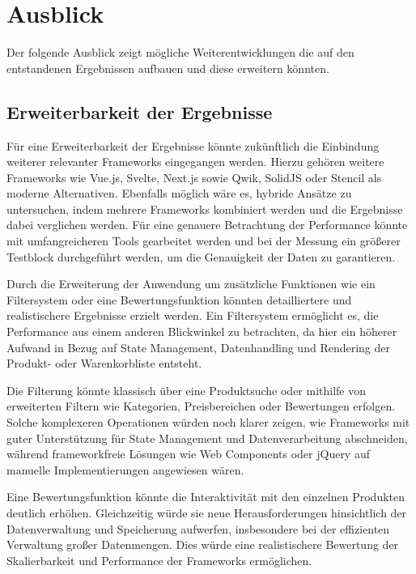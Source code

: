 \documentclass[oneside]{ausarbeitung}
\begin{document}
\section{Ausblick}
\label{sec:ausblick}

Der folgende Ausblick zeigt mögliche Weiterentwicklungen die auf den entstandenen Ergebnissen aufbauen und diese erweitern könnten.

\subsection{Erweiterbarkeit der Ergebnisse}
\label{sub:erweiterbarkeit}

Für eine Erweiterbarkeit der Ergebnisse könnte zukünftlich die Einbindung weiterer relevanter Frameworks eingegangen werden. Hierzu gehören weitere Frameworks wie Vue.js, Svelte, Next.js sowie Qwik, SolidJS oder Stencil als moderne Alternativen. Ebenfalls möglich wäre es, hybride Ansätze zu untersuchen, indem mehrere Frameworks kombiniert werden und die Ergebnisse dabei verglichen werden. Für eine genauere Betrachtung der Performance könnte mit umfangreicheren Tools gearbeitet werden und bei der Messung ein größerer Testblock durchgeführt werden, um die Genauigkeit der Daten zu garantieren. 

Durch die Erweiterung der Anwendung um zusätzliche Funktionen wie ein Filtersystem oder eine Bewertungsfunktion könnten detailliertere und realistischere Ergebnisse erzielt werden. Ein Filtersystem ermöglicht es, die Performance aus einem anderen Blickwinkel zu betrachten, da hier ein höherer Aufwand in Bezug auf State Management, Datenhandling und Rendering der Produkt- oder Warenkorbliste entsteht.

Die Filterung könnte klassisch über eine Produktsuche oder mithilfe von erweiterten Filtern wie Kategorien, Preisbereichen oder Bewertungen erfolgen. Solche komplexeren Operationen würden noch klarer zeigen, wie Frameworks mit guter Unterstützung für State Management und Datenverarbeitung abschneiden, während frameworkfreie Lösungen wie Web Components oder jQuery auf manuelle Implementierungen angewiesen wären.

Eine Bewertungsfunktion könnte die Interaktivität mit den einzelnen Produkten deutlich erhöhen. Gleichzeitig würde sie neue Herausforderungen hinsichtlich der Datenverwaltung und Speicherung aufwerfen, insbesondere bei der effizienten Verwaltung großer Datenmengen. Dies würde eine realistischere Bewertung der Skalierbarkeit und Performance der Frameworks ermöglichen.
\end{document}
